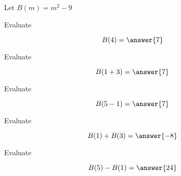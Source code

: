 \documentclass{ximera}
\author{Lee Wayand}
\begin{document}
\begin{exercise}





Let $B(m) = m^2 - 9$ \\







\begin{question}


Evaluate  

\[
B(4) = \answer{7}
\]


\end{question}







\begin{question}


Evaluate  

\[
B(1+3) = \answer{7}
\]


\end{question}









\begin{question}


Evaluate  

\[
B(5-1) = \answer{7}
\]


\end{question}











\begin{question}


Evaluate  

\[
B(1) + B(3) = \answer{-8}
\]


\end{question}









\begin{question}


Evaluate  

\[
B(5) - B(1) = \answer{24}
\]


\end{question}








\end{exercise}
\end{document}
